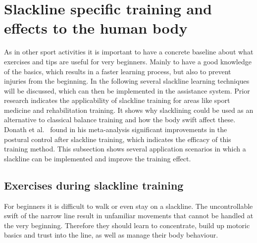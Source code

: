 \section{Slackline specific training and effects to the human body}

As in other sport activities it is important to have a concrete baseline about what exercises and tips are useful for very beginners. Mainly to have a good knowledge of the basics, which results in a faster learning process, but also to prevent injuries from the beginning. In the following several slackline learning techniques will be discussed, which can then be implemented in the assistance system. Prior research indicates the applicability of slackline training for areas like sport medicine and rehabilitation training. It shows why slacklining could be used as an alternative to classical balance training and how the body swift affect these. Donath et al.~\cite{Donath2016-rt} found in his meta-analysis significant improvements in the postural control after slackline training, which indicates the efficacy of this training method. This subsection shows several application scenarios in which a slackline can be implemented and improve the training effect.

\subsection{Exercises during slackline training}

For beginners it is difficult to walk or even stay on a slackline. The uncontrollable swift of the narrow line result in unfamiliar movements that cannot be handled at the very beginning. Therefore they should learn to concentrate, build up motoric basics and trust into the line, as well as manage their body behaviour.

